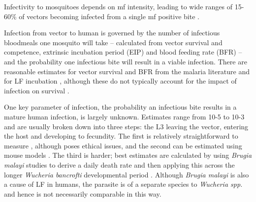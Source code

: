 Infectivity to mosquitoes depends on mf intensity, leading to wide ranges of 15-60\% of vectors becoming infected from a single mf positive bite \cite{Subramanian1998,gambhir2008}.

Infection from vector to human is governed by the number of infectious bloodmeals one mosquito will take – calculated from vector survival and competence, extrinsic incubation period (EIP) and blood feeding rate (BFR) – and the probability one infectious bite will result in a viable infection. There are reasonable estimates for vector survival and BFR from the malaria literature \cite{Killeen2000,Gary2001} and for LF incubation \cite{erickson2009}, although these do not typically account for the impact of infection on survival \cite{Subramanian1998}. 

One key parameter of infection, the probability an infectious bite results in a mature human infection, is largely unknown. Estimates range from 10-5 to 10-3 \cite{Hairston1968,Jones2014} and are usually broken down into three steps: the L3 leaving the vector, entering the host and developing to fecundity. The first is relatively straightforward to measure \cite{deMeillon1997}, although poses ethical issues, and the second can be estimated using mouse models \cite{Ho1967,Ewert1967}. The third is harder; best estimates are calculated by using \textit{Brugia malayi} studies to derive a daily death rate and then applying this across the longer \textit{Wucheria bancrofti} developmental period \cite{Norman2000_epifil,Addiss2000}. Although \textit{Brugia malayi} is also a cause of LF in humans, the parasite is of a separate species to \textit{Wucheria spp.} and hence is not necessarily comparable in this way. 

